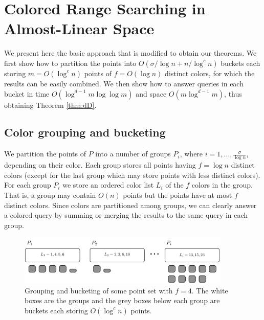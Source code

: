 \section{Colored Range Searching in Almost-Linear Space}
\label{sec:basics}
%
We present here the basic approach that is modified to obtain our theorems. We first show how to partition the points into $O(\sigma / \log n + n / \log ^c n)$ buckets each storing $m = O(\log ^c n)$ points of $f = O(\log n)$ distinct colors, for which the results can be easily combined. We then show how to answer queries in each bucket in time $O(\log ^{d-1} m \log \log m)$ and space $O(m \log ^{d-1} m)$, thus obtaining Theorem \ref{thm:dD}.

\subsection{Color grouping and bucketing}
%
We partition the points of $P$ into a number of groups $P_i$, where $i = 1, \ldots, \frac{\sigma}{\log n}$, depending on their color. Each group stores all points having $f = \log n$ distinct colors (except for the last group which may store points with less distinct colors). For each group $P_i$ we store an ordered color list $L_i$ of the $f$ colors in the group. That is, a group may contain $O(n)$ points but the points have at most $f$ distinct colors. Since colors are partitioned among groups, we can clearly answer a colored query by summing or merging the results to the same query in each group. 

\begin{figure}[tb]
	\begin{center}
	\includegraphics[width=0.9\textwidth]{chapters/papers/coloredrangecounting/groups-buckets}
	\caption{Grouping and bucketing of some point set with $f = 4$. The white boxes are the groups and the grey boxes below each group are buckets each storing $O(\log^c n)$ points.\label{fig:groups-buckets}}
	\end{center}
\end{figure} 

